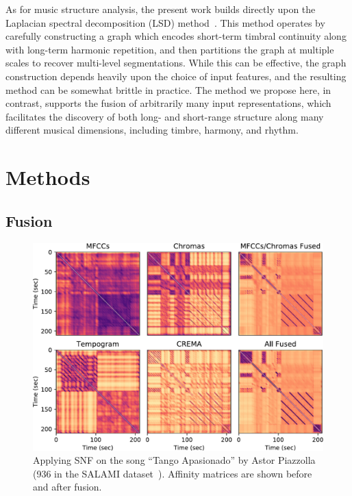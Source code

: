 \documentclass{article}
\begin{document}
As for music structure analysis, the present work builds directly upon the Laplacian spectral decomposition (LSD) method~\cite{mcfee2014spectral}.
This method operates by carefully constructing a graph which encodes short-term timbral continuity along with long-term harmonic repetition, and then partitions the graph at multiple scales to recover multi-level segmentations. While this can be effective, the graph construction depends heavily upon the choice of input features, and the resulting method can be somewhat brittle in practice. The method we propose here, in contrast, supports the fusion of arbitrarily many input representations, which facilitates the discovery of both long- and short-range structure along many different musical dimensions, including timbre, harmony, and rhythm.

\section{Methods}


\subsection{Fusion}\label{sec:SNF}

\begin{figure}
    \centering
    \includegraphics[width=0.95\columnwidth]{936_SSMs.pdf}
    \caption{Applying SNF on the song ``Tango Apasionado'' by Astor Piazzolla (936 in the SALAMI dataset~\cite{smith2011design}).  Affinity matrices are shown before and after fusion.}\label{fig:SSMs}
\end{figure}
\end{document}
